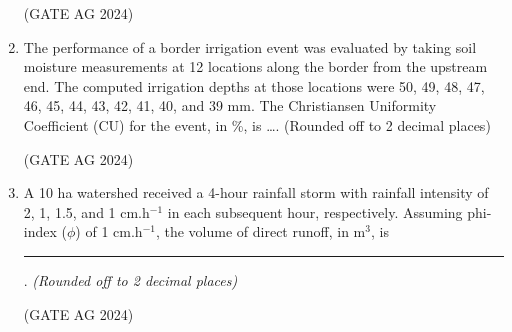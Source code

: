 \documentclass[journal]{IEEEtran}
\begin{document}
\begin{enumerate}
\begin{enumerate}
\end{enumerate}
 \hfill(GATE AG 2024)\\

 \medskip

\item 
{The performance of a border irrigation event was evaluated by taking soil moisture measurements at 12 locations along the border from the upstream end. The computed irrigation depths at those locations were 50, 49, 48, 47, 46, 45, 44, 43, 42, 41, 40, and 39 mm. The Christiansen Uniformity Coefficient (CU) for the event, in \%, is \dots. (Rounded off to 2 decimal places)}

\begin{enumerate}
\end{enumerate}
 \hfill(GATE AG 2024)\\

 \medskip

\item 
A 10 ha watershed received a 4-hour rainfall storm with rainfall intensity of 2, 1, 1.5, and 1 cm.h$^{-1}$ in each subsequent hour, respectively. Assuming phi-index ($\phi$) of 1 cm.h$^{-1}$, the volume of direct runoff, in m$^3$, is \rule{4cm}{0.15mm}. \textit{(Rounded off to 2 decimal places)}

\begin{enumerate}
\end{enumerate}
 \hfill(GATE AG 2024)\\


\end{enumerate}
\end{document}
